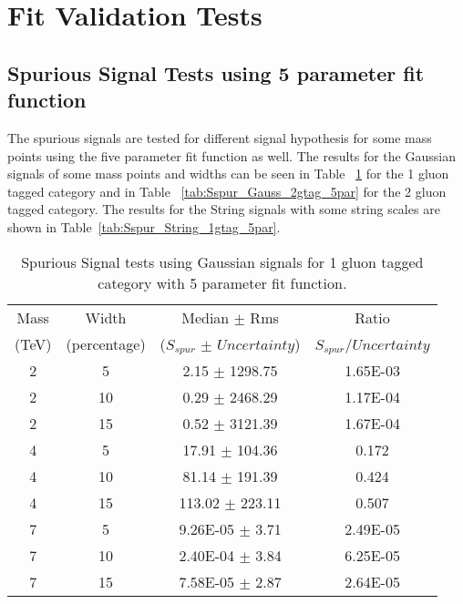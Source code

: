 \section{Fit Validation Tests}
\label{section:FitValidTets}

\subsection{Spurious Signal Tests using 5 parameter fit function}

The spurious signals are tested for different signal hypothesis for some mass points using the five parameter fit function as well.
The results for the Gaussian signals of some mass points and widths can be seen in Table ~\ref{tab:Sspur_Gauss_1gtag_5par} for the 1 gluon
tagged category and in Table ~\ref{tab:Sspur_Gauss_2gtag_5par} for the 2 gluon tagged category.
The results for the String signals with some string scales are shown in Table~\ref{tab:Sspur_String_1gtag_5par}.

\begin{table}[ht]
\begin{center}
\begin{tabular}{|c|c|c|c|}
\hline
Mass & Width & Median $\pm$ Rms & Ratio \\
(TeV)  & (percentage) & ($S_{spur}$ $\pm$ $Uncertainty$) & $S_{spur}$/$Uncertainty$ \\
\hline
2  & 5 & 2.15 $\pm$ 1298.75 & 1.65E-03 \\
2  & 10 & 0.29 $\pm$ 2468.29 & 1.17E-04 \\
2  & 15 & 0.52 $\pm$ 3121.39 & 1.67E-04 \\
4  & 5 & 17.91 $\pm$ 104.36 & 0.172 \\
4  & 10 & 81.14 $\pm$ 191.39 & 0.424 \\
4  & 15 & 113.02 $\pm$ 223.11 & 0.507 \\
7  & 5 & 9.26E-05 $\pm$ 3.71 & 2.49E-05 \\
7  & 10 & 2.40E-04 $\pm$ 3.84 & 6.25E-05 \\
7  & 15 & 7.58E-05 $\pm$ 2.87 & 2.64E-05 \\
\hline
\end{tabular}
\end{center}
\caption{Spurious Signal tests using Gaussian signals for 1 gluon tagged category with 5 parameter fit function.}
\label{tab:Sspur_Gauss_1gtag_5par}
\end{table}%

